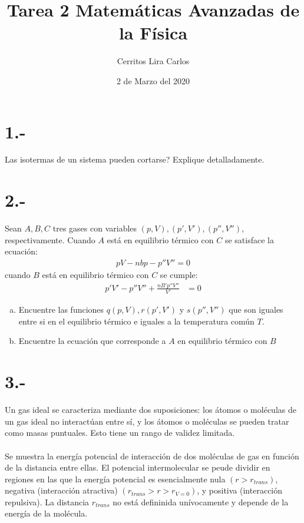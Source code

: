 \documentclass{article}
\title{Tarea 2 Matemáticas Avanzadas de la Física}
\author{Cerritos Lira Carlos}
\date{2 de Marzo del 2020}
\begin{document}
\maketitle
\section*{1.-}
Las isotermas de un sistema pueden cortarse? Explique detalladamente.

\section*{2.-}
Sean $A,B,C$ tres gases con variables $(p,V),(p',V'),(p'',V'')$, respectivamente. 
Cuando $A$ está en equilibrio térmico con $C$ se satisface la ecuación:
\begin{align*}
    pV - nbp - p''V'' = 0
\end{align*}
cuando $B$ está en equilibrio térmico con $C$ se cumple:
\begin{align*}
    p'V' - p''V'' + \frac{nB'p''V''}{V'} &= 0
\end{align*}
\begin{enumerate}[a)]
    \item Encuentre las funciones $q(p,V),r(p',V')$ y $s(p'',V'')$ que son iguales 
    entre si en el equilibrio térmico e iguales a la temperatura común $T$.

    \item Encuentre la ecuación que corresponde a $A$ en equilibrio térmico con $B$
\end{enumerate}

\section*{3.-}
Un gas ideal se caracteriza mediante dos suposiciones: los átomos o moléculas de un gas 
ideal no interactúan entre sí, y los átomos o moléculas se pueden tratar como masas 
puntuales. Esto tiene un rango de validez limitada. \\ \\ 
Se muestra la energía potencial de interacción de dos moléculas de gas en función 
de la distancia entre ellas. El potencial intermolecular se peude dividir en regiones
en las que la energía potencial es esencialmente nula $(r>r_{trans})$, negativa
(interacción atractiva) $(r_{trans} > r > r_{V=0})$, y positiva (interacción repulsiva).
La distancia $r_{trans}$ no está defininida unívocamente y depende de la energía de la 
molécula.
\end{document}
